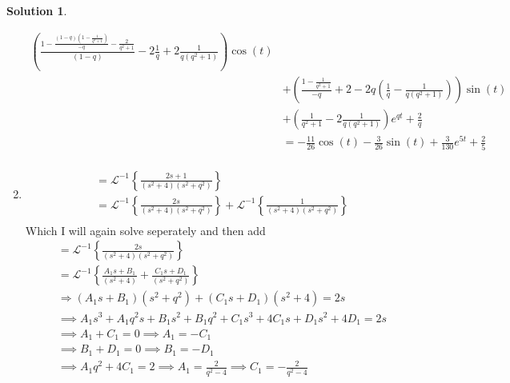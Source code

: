 \documentclass[10pt]{article}
\theoremstyle{definition}
\newtheorem{soln}{Solution}
\newcommand{\laplacei}[1]{\mathcal{L}^{-1}\left\{#1\right\}}
\begin{document}
\begin{soln}
\begin{enumerate}[label=(\alph*)]
\begin{align*}
            \left(\frac{1-\frac{\left(1-q\right)\left(1-\frac{1}{q^2+1}\right)}{-q}-\frac{2}{q^2+1}}{\left(1-q\right)}-2\frac{1}{q}+2\frac{1}{q\left(q^2+1\right)}\right)\cos\left(t\right) \\
             & +\left(\frac{1-\frac{1}{q^2+1}}{-q}+2-2q\left(\frac{1}{q}-\frac{1}{q\left(q^2+1\right)}\right)\right)\sin\left(t\right)                                                      \\
             & +\left(\frac{1}{q^2+1}-2\frac{1}{q\left(q^2+1\right)}\right)e^{qt}+\frac{2}{q}                                                                                               \\
             & = -\frac{11}{26}\cos\left(t\right)-\frac{3}{26}\sin\left(t\right)+\frac{3}{130}e^{5t}+\frac{2}{5}                                                                            \\
          \end{align*}
    \item \begin{align*}
             & =\laplacei{\frac{2s+1}{\left(s^2+4\right)\left(s^2+q^2\right)}}                                                           \\
             & =\laplacei{\frac{2s}{\left(s^2+4\right)\left(s^2+q^2\right)}}+\laplacei{\frac{1}{\left(s^2+4\right)\left(s^2+q^2\right)}} \\
          \end{align*}
          Which I will again solve seperately and then add
          \begin{align*}
             & = \laplacei{\frac{2s}{\left(s^2+4\right)\left(s^2+q^2\right)}}                                     \\
             & = \laplacei{\frac{A_1s+B_1}{\left(s^2+4\right)}+\frac{C_1s+D_1}{\left(s^2+q^2\right)}}             \\
             & \Rightarrow \left(A_1s+B_1\right)\left(s^2+q^2\right) + \left(C_1s+D_1\right)\left(s^2+4\right)=2s \\
             & \implies A_1s^3+A_1q^2s+B_1s^2+B_1q^2+C_1s^3+4C_1s+D_1s^2+4D_1=2s                                  \\
             & \implies A_1+C_1=0 \implies A_1=-C_1                                                               \\
             & \implies B_1+D_1=0 \implies B_1=-D_1                                                               \\
             & \implies A_1q^2+4C_1=2\implies A_1=\frac{2}{q^2-4}\implies C_1=-\frac{2}{q^2-4}                    \\

\end{align*}
\end{enumerate}
\end{soln}
\end{document}
